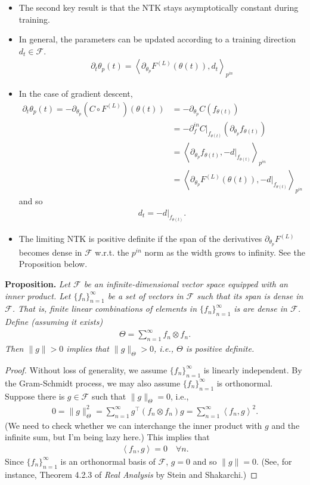 \documentclass[10pt]{article}
\newcommand{\FF}{\mathcal{F}}
\newcommand{\inner}[2]{\left\langle #1, #2 \right\rangle}
\newcommand{\paran}[1]{{( #1 )}}
\newcommand{\pin}{{p^{in}}}
\newcommand{\din}{\partial^{in}}
\begin{document}
\begin{itemize}
\item The second key result is that the NTK stays asymptotically constant during training.
\item In general, the parameters can be updated according to a training direction $d_t \in \FF$.
\begin{align*}
\partial_t \theta_p(t) = \inner{\partial_{\theta_p} F^\paran{L}(\theta(t))}{d_t}_\pin
\end{align*}
\item In the case of gradient descent,
\begin{align*}
\partial_t \theta_p(t) = -\partial_{\theta_p}(C \circ F^\paran{L})(\theta(t)) &= -\partial_{\theta_p} C(f_{\theta(t)}) \\
&= -\din_f C|_{f_{\theta(t)}}(\partial_{\theta_p} f_{\theta(t)}) \\
&=  \inner{\partial_{\theta_p} f_{\theta(t)}}{-d|_{f_{\theta(t)}}}_\pin \\
&= \inner{\partial_{\theta_p} F^\paran{L}(\theta(t))}{-d|_{f_{\theta(t)}}}_\pin
\end{align*}
and so
\begin{align*}
d_t = -d|_{f_{\theta(t)}}.
\end{align*}
\item The limiting NTK is positive definite if the span of the derivatives $\partial_{\theta_p} F^\paran{L}$ becomes dense in $\FF$ w.r.t. the $\pin$ norm as the width grows to infinity. See the Proposition below.
\end{itemize}

\textbf{Proposition.} \textit{Let $\FF$ be an infinite-dimensional vector space equipped with an inner product. Let $\{f_n\}_{n = 1}^\infty$ be a set of vectors in $\FF$ such that its span is dense in $\FF$. That is, finite linear combinations of elements in $\{f_n\}_{n = 1}^\infty$ is are dense in $\FF$. Define (assuming it exists)
\begin{align*}
\Theta = \sum_{n = 1}^\infty f_n \otimes f_n.
\end{align*}
Then $\|g\| > 0$ implies that $\|g\|_\Theta > 0$, i.e., $\Theta$ is positive definite.}

\begin{proof}
Without loss of generality, we assume $\{f_n\}_{n = 1}^\infty$ is linearly independent. By the Gram-Schmidt process, we may also assume $\{f_n\}_{n = 1}^\infty$ is orthonormal. Suppose there is $g \in \FF$ such that $\|g\|_\Theta = 0$, i.e.,
\begin{align*}
0 = \|g\|_\Theta^2 = \sum_{n = 1}^\infty g^\top (f_n \otimes f_n) g = \sum_{n = 1}^\infty \inner{f_n}{g}^2.
\end{align*}
(We need to check whether we can interchange the inner product with $g$ and the infinite sum, but I'm being lazy here.) This implies that
\begin{align*}
\inner{f_n}{g} = 0 \quad \forall n.
\end{align*}
Since $\{f_n\}_{n = 1}^\infty$ is an orthonormal basis of $\FF$, $g = 0$ and so $\|g\| = 0$. (See, for instance, Theorem 4.2.3 of \textit{Real Analysis} by Stein and Shakarchi.)
\end{proof}
\end{document}
